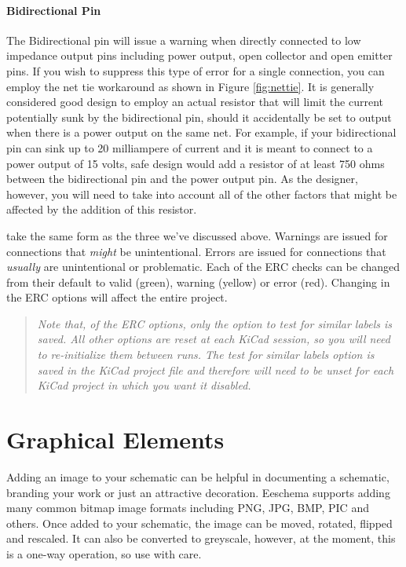 \paragraph{Bidirectional Pin} The Bidirectional pin will issue a warning when directly connected to low impedance output pins including power output, open collector and open emitter pins.
If you wish to suppress this type of error for a single connection, you can employ the net tie workaround as shown in Figure \ref{fig:nettie}.
It is generally considered good design to employ an actual resistor that will limit the current potentially sunk by the bidirectional pin, should it accidentally be set to output when there is a power output on the same net.
For example, if your bidirectional pin can sink up to 20 milliampere of current and it is meant to connect to a power output of 15 volts, safe design would add a resistor of at least 750 ohms between the bidirectional pin and the power output pin.
As the designer, however, you will need to take into account all of the other factors that might be affected by the addition of this resistor.

 take the same form as the three we've discussed above.
Warnings are issued for connections that \textit{might} be unintentional.
Errors are issued for connections that \textit{usually} are unintentional or problematic.
Each of the ERC checks can be changed from their default to valid (green), warning (yellow) or error (red).
Changing in the ERC options will affect the entire project.

\begin{quote}
	\itshape Note that, of the ERC options, only the option to test for similar labels is saved.
	All other options are reset at each KiCad session, so you will need to re-initialize them between runs.
	The test for similar labels option is saved in the KiCad project file and therefore will need to be unset for each KiCad project in which you want it disabled.
\end{quote}

\section{Graphical Elements}
Adding an image to your schematic can be helpful in documenting a schematic, branding your work or just an attractive decoration.
Eeschema supports adding many common bitmap image formats including PNG, JPG, BMP, PIC and others.
Once added to your schematic, the image can be moved, rotated, flipped and rescaled.
It can also be converted to greyscale, however, at the moment, this is a one-way operation, so use with care.

